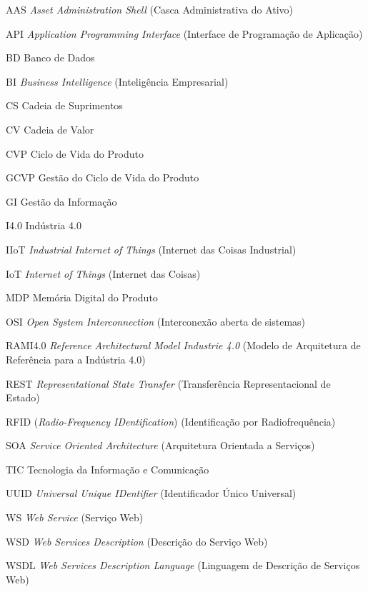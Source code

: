 \begin{siglas}
	\item[AAS] \textit{Asset Administration Shell} (Casca Administrativa do Ativo)
	\item[API] \textit{Application Programming Interface} (Interface de Programação de Aplicação)
	\item[BD] Banco de Dados
	\item[BI] \textit{Business Intelligence} (Inteligência Empresarial)
	\item[CS] Cadeia de Suprimentos
	\item[CV] Cadeia de Valor
	\item[CVP] Ciclo de Vida do Produto
	\item[GCVP] Gestão do Ciclo de Vida do Produto
	\item[GI] Gestão da Informação
	\item[I4.0] Indústria 4.0
	\item[IIoT] \textit{Industrial Internet of Things} (Internet das Coisas Industrial)
	\item[IoT] \textit{Internet of Things} (Internet das Coisas)
	\item[MDP] Memória Digital do Produto
	\item[OSI] \textit{Open System Interconnection} (Interconexão aberta de sistemas)
	\item[RAMI4.0] \textit{Reference Architectural Model Industrie 4.0} (Modelo de Arquitetura de Referência para a Indústria 4.0)
	\item[REST] \textit{Representational State Transfer} (Transferência Representacional de Estado)
	\item[RFID] (\textit{Radio-Frequency IDentification}) (Identificação por Radiofrequência)
	\item[SOA] \textit{Service Oriented Architecture} (Arquitetura Orientada a Serviços)
  	\item[TIC] Tecnologia da Informação e Comunicação
  	\item[UUID] \textit{Universal Unique IDentifier} (Identificador Único Universal)
  	\item[WS] \textit{Web Service} (Serviço Web)
  	\item[WSD] \textit{Web Services Description} (Descrição do Serviço Web)
  	\item[WSDL] \textit{Web Services Description Language} (Linguagem de Descrição de Serviços Web)
\end{siglas}

\tableofcontents*
\cleardoublepage
